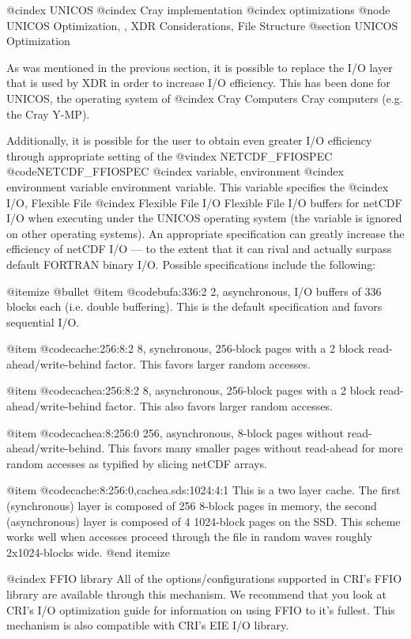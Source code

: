 {@cindex UNICOS
@cindex Cray implementation
@cindex optimizations
@node UNICOS Optimization,  , XDR Considerations, File Structure
@section UNICOS Optimization

As was mentioned in the previous section, it is possible to replace the
I/O layer that is used by XDR in order to increase I/O efficiency.
This has been done for UNICOS, the operating system of
@cindex Cray Computers
Cray computers (e.g. the Cray Y-MP).

Additionally, it is possible for the user to obtain even greater
I/O efficiency through appropriate setting of the
@vindex NETCDF_FFIOSPEC
@code{NETCDF_FFIOSPEC}
@cindex variable, environment
@cindex environment variable
environment variable.
This variable specifies the
@cindex I/O, Flexible File
@cindex Flexible File I/O
Flexible File I/O buffers for netCDF I/O
when executing
under the UNICOS operating system (the variable is ignored on other
operating systems).
An appropriate specification can greatly increase the efficiency of
netCDF I/O --- to the extent that it can rival and actually surpass
default FORTRAN binary I/O.
Possible specifications include the following:

@itemize @bullet
@item @code{bufa:336:2}
2, asynchronous, I/O buffers of 336 blocks each (i.e. double buffering).
This is the default specification and favors sequential I/O.

@item @code{cache:256:8:2}
8, synchronous, 256-block pages with a 2 block read-ahead/write-behind
factor.
This favors larger random accesses.

@item @code{cachea:256:8:2}
8, asynchronous, 256-block pages with a 2 block read-ahead/write-behind
factor.
This also favors larger random accesses.

@item @code{cachea:8:256:0}
256, asynchronous, 8-block pages without read-ahead/write-behind.
This favors many smaller pages without read-ahead for more random
accesses as typified by slicing netCDF arrays.

@item @code{cache:8:256:0,cachea.sds:1024:4:1}
This is a two layer cache.  The first (synchronous) layer is composed of
256 8-block pages in memory, the second (asynchronous) layer is composed
of 4 1024-block pages on the SSD.  This scheme works well when accesses
proceed through the file in random waves roughly 2x1024-blocks wide.
@end itemize

@cindex FFIO library
All of the options/configurations supported in CRI's FFIO library are
available through this mechanism.
We recommend that you look at CRI's I/O optimization guide for
information on using FFIO to it's fullest.
This mechanism is also compatible with CRI's EIE I/O library.

}
